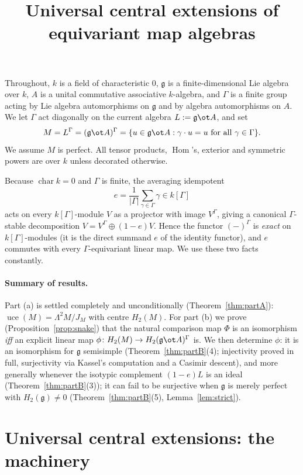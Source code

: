 \documentclass{amsart}
\theoremstyle{definition}
\DeclareMathOperator{\uce}{uce}
\DeclareMathOperator{\Hom}{Hom}
\newcommand{\g}{\mathfrak{g}}
\newcommand{\Gm}{\Gamma}
\begin{document}
\title{Universal central extensions of equivariant map algebras}
\maketitle

Throughout, $k$ is a field of characteristic $0$, $\g$ is a finite-dimensional
Lie algebra over $k$, $A$ is a unital commutative associative $k$-algebra, and
$\Gm$ is a finite group acting by Lie algebra automorphisms on $\g$ and by algebra
automorphisms on $A$. We let $\Gm$ act diagonally on the current algebra
$L:=\g\ot A$, and set
\[
   M=L^{\Gm}=(\g\ot A)^{\Gm}=\{u\in\g\ot A:\gamma\cdot u=u\ \text{for all }\gamma\in\Gm\}.
\]
We assume $M$ is perfect.  All tensor products, $\Hom$'s, exterior and symmetric
powers are over $k$ unless decorated otherwise.

Because $\operatorname{char}k=0$ and $\Gm$ is finite, the averaging idempotent
\[
   e=\frac{1}{|\Gm|}\sum_{\gamma\in\Gm}\gamma\in k[\Gm]
\]
acts on every $k[\Gm]$-module $V$ as a projector with image $V^{\Gm}$, giving a
canonical $\Gm$-stable decomposition $V=V^{\Gm}\oplus(1-e)V$.  Hence the functor
$(-)^{\Gm}$ is \emph{exact} on $k[\Gm]$-modules (it is the direct summand $e$ of
the identity functor), and $e$ commutes with every $\Gm$-equivariant linear map.
We use these two facts constantly.

\paragraph{Summary of results.}  Part (a) is settled completely and unconditionally
(Theorem~\ref{thm:partA}): $\uce(M)=\Lambda^2M/J_M$ with centre $H_2(M)$.  For part
(b) we prove (Proposition~\ref{prop:snake}) that the natural comparison map $\Phi$
is an isomorphism \emph{iff} an explicit linear map
$\phi\colon H_2(M)\to H_2(\g\ot A)^{\Gm}$ is.  We then determine $\phi$:
it is an isomorphism for $\g$ semisimple (Theorem~\ref{thm:partB}(4); injectivity
proved in full, surjectivity via Kassel's computation and a Casimir descent), and more generally whenever the
isotypic complement $(1-e)L$ is an ideal (Theorem~\ref{thm:partB}(3)); it can fail
to be surjective when $\g$ is merely perfect with $H_2(\g)\ne0$
(Theorem~\ref{thm:partB}(5), Lemma~\ref{lem:strict}).

\bigskip
\section{Universal central extensions: the machinery}
\end{document}
